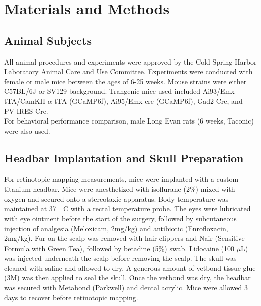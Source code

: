 
\chapter{Materials and Methods} %

\label{AppendixA} %

\section{Animal Subjects}
All animal procedures and experiments were approved by the Cold Spring Harbor Laboratory Animal Care and Use Committee. Experiments were conducted with female or male mice between the ages of 6-25 weeks. Mouse strains were either C57BL/6J or SV129 background. Trangenic mice used included Ai93/Emx-tTA/CamKII $\alpha$-tTA (GCaMP6f), Ai95/Emx-cre (GCaMP6f), Gad2-Cre, and PV-IRES-Cre. \\
For behavioral performance comparison, male Long Evan rats (6 weeks, Taconic) were also used. 

\section{Headbar Implantation and Skull Preparation}
For retinotopic mapping measurements, mice were implanted with a custom titanium headbar. Mice were anesthetized with isoflurane (2\%) mixed with oxygen and secured onto a stereotaxic apparatus. Body temperature was maintained at 37 $^{\circ}$ C with a rectal temperature probe. The eyes were lubricated with eye ointment before the start of the surgery, followed by subcutaneous injection of analgesia (Meloxicam, 2mg/kg) and antibiotic (Enrofloxacin, 2mg/kg). Fur on the scalp was removed with hair clippers and Nair (Sensitive Formula with Green Tea), followed by betadine (5\%) swab. Lidocaine (100 $\mu $L) was injected underneath the scalp before removing the scalp. The skull was cleaned with saline and allowed to dry. A generous amount of vetbond tissue glue (3M) was then applied to seal the skull. Once the vetbond was dry, the headbar was secured with Metabond (Parkwell) and dental acrylic. Mice were allowed 3 days to recover before retinotopic mapping. 
 
